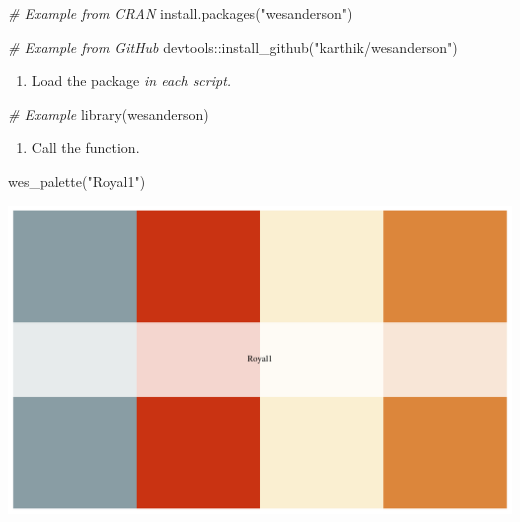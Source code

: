 \documentclass[
]{book}
\newenvironment{Shaded}{\begin{snugshade}}{\end{snugshade}}
\newcommand{\CommentTok}[1]{\textcolor[rgb]{0.56,0.35,0.01}{\textit{#1}}}
\newcommand{\FunctionTok}[1]{\textcolor[rgb]{0.00,0.00,0.00}{#1}}
\newcommand{\NormalTok}[1]{#1}
\newcommand{\SpecialCharTok}[1]{\textcolor[rgb]{0.00,0.00,0.00}{#1}}
\newcommand{\StringTok}[1]{\textcolor[rgb]{0.31,0.60,0.02}{#1}}
\providecommand{\tightlist}{%
  \setlength{\itemsep}{0pt}\setlength{\parskip}{0pt}}
\begin{document}
\begin{Shaded}
\begin{Highlighting}[]
\CommentTok{\# Example from CRAN}
\FunctionTok{install.packages}\NormalTok{(}\StringTok{"wesanderson"}\NormalTok{)}

\CommentTok{\# Example from GitHub}
\NormalTok{devtools}\SpecialCharTok{::}\FunctionTok{install\_github}\NormalTok{(}\StringTok{"karthik/wesanderson"}\NormalTok{)}
\end{Highlighting}
\end{Shaded}

\begin{enumerate}
\def\labelenumi{\arabic{enumi}.}
\setcounter{enumi}{1}
\tightlist
\item
  Load the package \emph{in each script.}
\end{enumerate}

\begin{Shaded}
\begin{Highlighting}[]
\CommentTok{\# Example}
\FunctionTok{library}\NormalTok{(wesanderson)}
\end{Highlighting}
\end{Shaded}

\begin{enumerate}
\def\labelenumi{\arabic{enumi}.}
\setcounter{enumi}{2}
\tightlist
\item
  Call the function.
\end{enumerate}

\begin{Shaded}
\begin{Highlighting}[]
\FunctionTok{wes\_palette}\NormalTok{(}\StringTok{"Royal1"}\NormalTok{)}
\end{Highlighting}
\end{Shaded}

\includegraphics{figures/unnamed-chunk-135-1.pdf}
\end{document}
